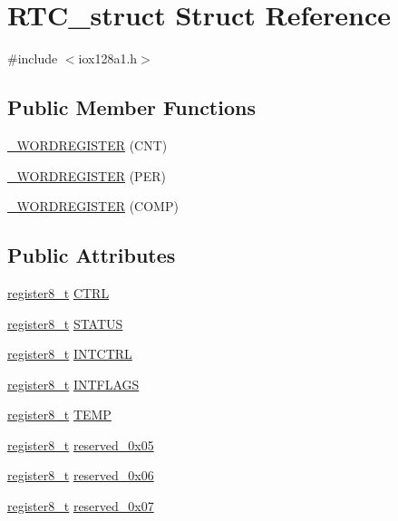 \hypertarget{struct_r_t_c__struct}{
\section{RTC\_\-struct Struct Reference}
\label{struct_r_t_c__struct}
}


{\ttfamily \#include $<$iox128a1.h$>$}

\subsection*{Public Member Functions}
\begin{DoxyCompactItemize}
\item 
\hyperlink{struct_r_t_c__struct_a11c40ba57f4465d2a707b78b48195337}{\_\-WORDREGISTER} (CNT)
\item 
\hyperlink{struct_r_t_c__struct_a9080efcafdb424be97377c2d9ff8a7b7}{\_\-WORDREGISTER} (PER)
\item 
\hyperlink{struct_r_t_c__struct_a59d429b175b898b84d1028fd04915835}{\_\-WORDREGISTER} (COMP)
\end{DoxyCompactItemize}
\subsection*{Public Attributes}
\begin{DoxyCompactItemize}
\item 
\hyperlink{iox128a1_8h_a6a0649252b392263406882923b04a9db}{register8\_\-t} \hyperlink{struct_r_t_c__struct_ae1b065d3b1b8e251865aa1099e8e5de5}{CTRL}
\item 
\hyperlink{iox128a1_8h_a6a0649252b392263406882923b04a9db}{register8\_\-t} \hyperlink{struct_r_t_c__struct_a30d6c28d300ad2f470d767a76974a1b8}{STATUS}
\item 
\hyperlink{iox128a1_8h_a6a0649252b392263406882923b04a9db}{register8\_\-t} \hyperlink{struct_r_t_c__struct_af0f7764a383ac790d6574dad6e73741c}{INTCTRL}
\item 
\hyperlink{iox128a1_8h_a6a0649252b392263406882923b04a9db}{register8\_\-t} \hyperlink{struct_r_t_c__struct_a38c8904b67193d1994bfcf94a242df25}{INTFLAGS}
\item 
\hyperlink{iox128a1_8h_a6a0649252b392263406882923b04a9db}{register8\_\-t} \hyperlink{struct_r_t_c__struct_a3cf47639ce38cccf25deaefb1b988050}{TEMP}
\item 
\hyperlink{iox128a1_8h_a6a0649252b392263406882923b04a9db}{register8\_\-t} \hyperlink{struct_r_t_c__struct_a91d54dab17a043d1010baec890f98bab}{reserved\_\-0x05}
\item 
\hyperlink{iox128a1_8h_a6a0649252b392263406882923b04a9db}{register8\_\-t} \hyperlink{struct_r_t_c__struct_a1def5d5fd2c1ebddc880750092f75fd6}{reserved\_\-0x06}
\item 
\hyperlink{iox128a1_8h_a6a0649252b392263406882923b04a9db}{register8\_\-t} \hyperlink{struct_r_t_c__struct_a615de80f154a3326eb22e41597a5838a}{reserved\_\-0x07}
\end{DoxyCompactItemize}


